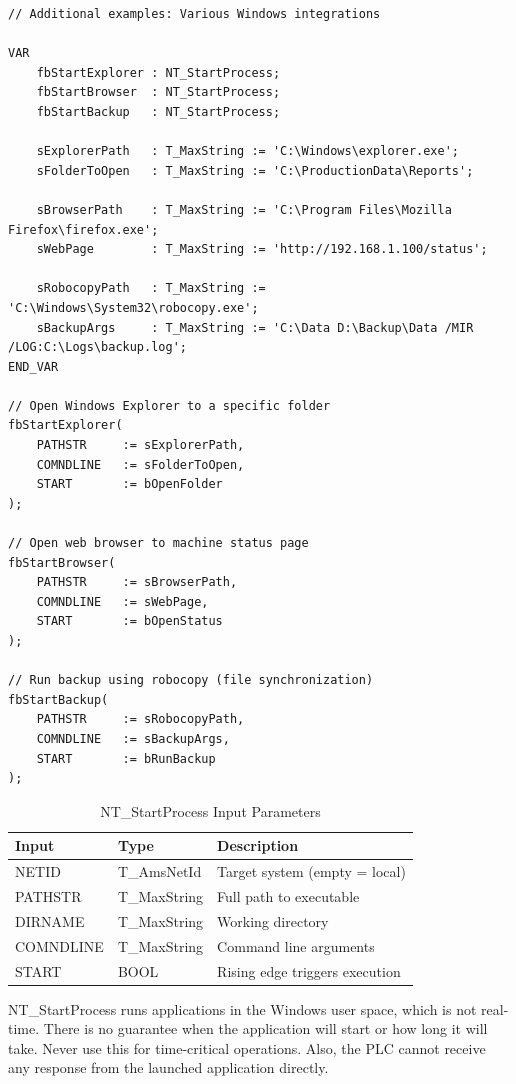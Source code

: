 \documentclass[11pt,a4paper]{article}
\begin{document}
\begin{lstlisting}
// Additional examples: Various Windows integrations

VAR
    fbStartExplorer : NT_StartProcess;
    fbStartBrowser  : NT_StartProcess;
    fbStartBackup   : NT_StartProcess;
    
    sExplorerPath   : T_MaxString := 'C:\Windows\explorer.exe';
    sFolderToOpen   : T_MaxString := 'C:\ProductionData\Reports';
    
    sBrowserPath    : T_MaxString := 'C:\Program Files\Mozilla Firefox\firefox.exe';
    sWebPage        : T_MaxString := 'http://192.168.1.100/status';
    
    sRobocopyPath   : T_MaxString := 'C:\Windows\System32\robocopy.exe';
    sBackupArgs     : T_MaxString := 'C:\Data D:\Backup\Data /MIR /LOG:C:\Logs\backup.log';
END_VAR

// Open Windows Explorer to a specific folder
fbStartExplorer(
    PATHSTR     := sExplorerPath,
    COMNDLINE   := sFolderToOpen,
    START       := bOpenFolder
);

// Open web browser to machine status page
fbStartBrowser(
    PATHSTR     := sBrowserPath,
    COMNDLINE   := sWebPage,
    START       := bOpenStatus
);

// Run backup using robocopy (file synchronization)
fbStartBackup(
    PATHSTR     := sRobocopyPath,
    COMNDLINE   := sBackupArgs,
    START       := bRunBackup
);
\end{lstlisting}

\begin{table}[h]
\centering
\begin{tabular}{@{}llp{6cm}@{}}
\toprule
\textbf{Input} & \textbf{Type} & \textbf{Description} \\
\midrule
NETID & T\_AmsNetId & Target system (empty = local) \\
PATHSTR & T\_MaxString & Full path to executable \\
DIRNAME & T\_MaxString & Working directory \\
COMNDLINE & T\_MaxString & Command line arguments \\
START & BOOL & Rising edge triggers execution \\
\bottomrule
\end{tabular}
\caption{NT\_StartProcess Input Parameters}
\end{table}

\begin{warningbox}
NT\_StartProcess runs applications in the Windows user space, which is not real-time. There is no guarantee when the application will start or how long it will take. Never use this for time-critical operations. Also, the PLC cannot receive any response from the launched application directly.
\end{warningbox}
\end{document}
